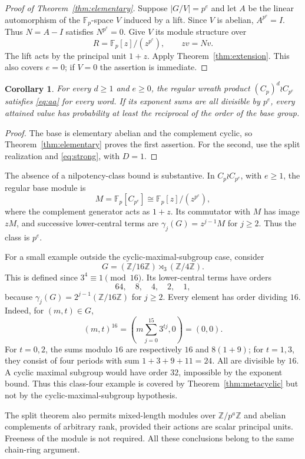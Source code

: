 \documentclass[11pt]{article}
\newtheorem{corollary}[theorem]{Corollary}
\theoremstyle{remark}\newtheorem{remark}[theorem]{Remark}
\newcommand{\F}{\mathbb F}
\newcommand{\Z}{\mathbb Z}
\begin{document}
\begin{proof}[Proof of Theorem~\ref{thm:elementary}]
Suppose $|G/V|=p^e$ and let $A$ be the linear automorphism of the $\F_p$-space $V$ induced by a lift. Since $V$ is abelian, $A^{p^e}=I$. Thus $N=A-I$ satisfies $N^{p^e}=0$. Give $V$ its module structure over
\[
 R=\F_p[z]/(z^{p^e}),\qquad zv=Nv.
\]
The lift acts by the principal unit $1+z$. Apply Theorem~\ref{thm:extension}. This also covers $e=0$; if $V=0$ the assertion is immediate.
\end{proof}

\begin{corollary}
For every $d\ge1$ and $e\ge0$, the regular wreath product $(C_p)^d\wr C_{p^e}$ satisfies \eqref{eq:aa} for every word. If its exponent sums are all divisible by $p^e$, every attained value has probability at least the reciprocal of the order of the base group.
\end{corollary}
\begin{proof}
The base is elementary abelian and the complement cyclic, so Theorem~\ref{thm:elementary} proves the first assertion. For the second, use the split realization and \eqref{eq:strong}, with $D=1$.
\end{proof}

The absence of a nilpotency-class bound is substantive. In $C_p\wr C_{p^e}$, with $e\ge1$, the regular base module is
\[
 M=\F_p[C_{p^e}]\cong\F_p[z]/(z^{p^e}),
\]
where the complement generator acts as $1+z$. Its commutator with $M$ has image $zM$, and successive lower-central terms are $\gamma_j(G)=z^{j-1}M$ for $j\ge2$. Thus the class is $p^e$.

For a small example outside the cyclic-maximal-subgroup case, consider
\[
 G=(\Z/16\Z)\rtimes_3(\Z/4\Z).
\]
This is defined since $3^4\equiv1\pmod{16}$. Its lower-central terms have orders
\[
 64,\quad 8,\quad 4,\quad 2,\quad 1,
\]
because $\gamma_j(G)=2^{j-1}(\Z/16\Z)$ for $j\ge2$. Every element has order dividing $16$. Indeed, for $(m,t)\in G$,
\[
 (m,t)^{16}=\left(m\sum_{j=0}^{15}3^{tj},0\right)=(0,0).
\]
For $t=0,2$, the sums modulo $16$ are respectively $16$ and $8(1+9)$; for $t=1,3$, they consist of four periods with sum $1+3+9+11=24$. All are divisible by $16$. A cyclic maximal subgroup would have order $32$, impossible by the exponent bound. Thus this class-four example is covered by Theorem~\ref{thm:metacyclic} but not by the cyclic-maximal-subgroup hypothesis.

The split theorem also permits mixed-length modules over $\Z/p^a\Z$ and abelian complements of arbitrary rank, provided their actions are scalar principal units. Freeness of the module is not required. All these conclusions belong to the same chain-ring argument.
\end{document}
